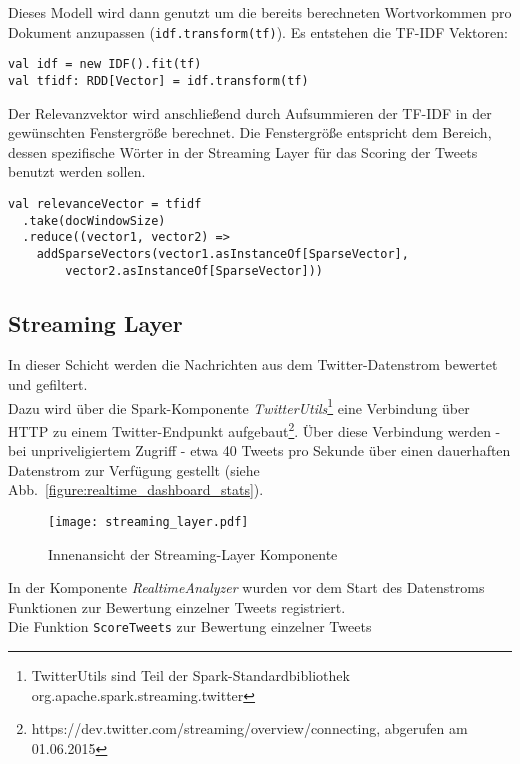 Dieses Modell wird dann genutzt um die bereits berechneten Wortvorkommen pro Dokument anzupassen (\lstinline|idf.transform(tf)|). Es entstehen die TF-IDF Vektoren:

\begin{lstlisting}
val idf = new IDF().fit(tf)
val tfidf: RDD[Vector] = idf.transform(tf)
\end{lstlisting}

Der Relevanzvektor wird anschließend durch Aufsummieren der TF-IDF in der gewünschten Fenstergröße berechnet. Die Fenstergröße entspricht dem Bereich, dessen spezifische Wörter in der Streaming Layer für das Scoring der Tweets benutzt werden sollen.

\begin{lstlisting}
val relevanceVector = tfidf
  .take(docWindowSize)
  .reduce((vector1, vector2) =>
    addSparseVectors(vector1.asInstanceOf[SparseVector], 
		vector2.asInstanceOf[SparseVector]))
\end{lstlisting}

\subsection{Streaming Layer}

In dieser Schicht werden die Nachrichten aus dem Twitter-Datenstrom bewertet und gefiltert.\\

Dazu wird über die Spark-Komponente \textit{TwitterUtils}\footnote{TwitterUtils sind Teil der Spark-Standardbibliothek org.apache.spark.streaming.twitter} eine Verbindung über HTTP zu einem Twitter-Endpunkt aufgebaut\footnote{https://dev.twitter.com/streaming/overview/connecting, abgerufen am 01.06.2015}. Über diese Verbindung werden - bei unpriveligiertem Zugriff - etwa 40 Tweets pro Sekunde über einen dauerhaften Datenstrom zur Verfügung gestellt (siehe Abb.~\ref{figure:realtime_dashboard_stats}).\\

\begin{figure}[ht!]
	\centering
  \texttt{[image: streaming\_layer.pdf]}
	\caption{Innenansicht der Streaming-Layer Komponente}
	\label{figure:demo_app_streaminglayer}
\end{figure}

In der Komponente \textit{RealtimeAnalyzer} wurden vor dem Start des Datenstroms Funktionen zur Bewertung einzelner Tweets registriert.\\

Die Funktion \lstinline|ScoreTweets| zur Bewertung einzelner Tweets

